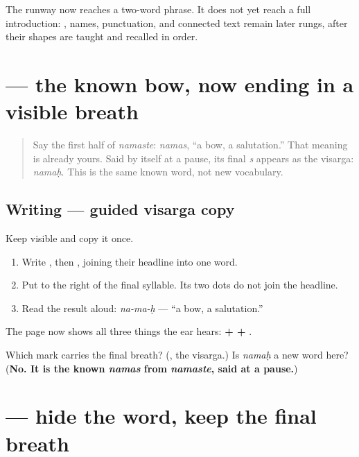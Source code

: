 \begin{tcolorbox}[breakable,colback=teal!4,colframe=teal!35!black,title={Before you move on}]
The runway now reaches a two-word phrase. It does not yet reach a full introduction: \textbf{}, names, punctuation, and connected text remain later rungs, after their shapes are taught and recalled in order.
\end{tcolorbox}
\section[\texorpdfstring{\sk{नमः} (namaḥ)}{नमः (namaḥ)}]{ — the known bow, now ending in a visible breath}

\label{lesson:SA-W03-namah-guided-copy}



\begin{quote}
Say the first half of \emph{namaste}: \emph{namas}, “a bow, a salutation.” That meaning is already yours. Said by itself at a pause, its final \emph{s} appears as the visarga: \emph{namaḥ}. This is the same known word, not new vocabulary.
\end{quote}

\subsection*{Writing — guided visarga copy}
Keep \textbf{} visible and copy it once.

\begin{enumerate}
\raggedright
  \item Write \textbf{}, then \textbf{}, joining their headline into one word.
  \item Put \textbf{} to the right of the final syllable. Its two dots do not join the headline.
  \item Read the result aloud: \emph{na-ma-ḥ} — “a bow, a salutation.”
\end{enumerate}

The page now shows all three things the ear hears: \textbf{ +  + }.

\begin{tcolorbox}[breakable,colback=teal!4,colframe=teal!35!black,title={Before you move on}]
Which mark carries the final breath? (\textbf{}, the visarga.) Is \emph{namaḥ} a new word here? (\textbf{No. It is the known \emph{namas} from \emph{namaste}, said at a pause.})
\end{tcolorbox}
\section[\texorpdfstring{\sk{नमः} (namaḥ)}{नमः (namaḥ)}]{ — hide the word, keep the final breath}

